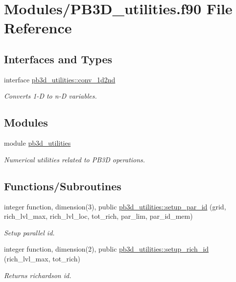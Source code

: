 \hypertarget{PB3D__utilities_8f90}{}\section{Modules/\+P\+B3\+D\+\_\+utilities.f90 File Reference}
\label{PB3D__utilities_8f90}
\subsection*{Interfaces and Types}
\begin{DoxyCompactItemize}
\item 
interface \hyperlink{interfacepb3d__utilities_1_1conv__1d2nd}{pb3d\+\_\+utilities\+::conv\+\_\+1d2nd}
\begin{DoxyCompactList}\small\item\em Converts 1-\/D to n-\/D variables. \end{DoxyCompactList}\end{DoxyCompactItemize}
\subsection*{Modules}
\begin{DoxyCompactItemize}
\item 
module \hyperlink{namespacepb3d__utilities}{pb3d\+\_\+utilities}
\begin{DoxyCompactList}\small\item\em Numerical utilities related to P\+B3D operations. \end{DoxyCompactList}\end{DoxyCompactItemize}
\subsection*{Functions/\+Subroutines}
\begin{DoxyCompactItemize}
\item 
integer function, dimension(3), public \hyperlink{namespacepb3d__utilities_ad047cd7b197aae821e2565933faccfa3}{pb3d\+\_\+utilities\+::setup\+\_\+par\+\_\+id} (grid, rich\+\_\+lvl\+\_\+max, rich\+\_\+lvl\+\_\+loc, tot\+\_\+rich, par\+\_\+lim, par\+\_\+id\+\_\+mem)
\begin{DoxyCompactList}\small\item\em Setup parallel id. \end{DoxyCompactList}\item 
integer function, dimension(2), public \hyperlink{namespacepb3d__utilities_ab461e756a85b3c6e8fa1ccaa6556c5b0}{pb3d\+\_\+utilities\+::setup\+\_\+rich\+\_\+id} (rich\+\_\+lvl\+\_\+max, tot\+\_\+rich)
\begin{DoxyCompactList}\small\item\em Returns richardson id. \end{DoxyCompactList}\end{DoxyCompactItemize}
